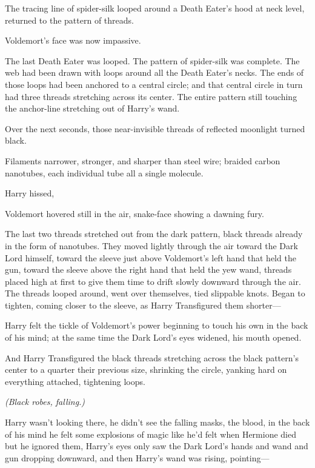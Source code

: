 The tracing line of spider-silk looped around a Death Eater's hood at neck
level, returned to the pattern of threads.

Voldemort's face was now impassive. 

The last Death Eater was looped. The pattern of spider-silk was complete. The
web had been drawn with loops around all the Death Eater's necks. The ends of
those loops had been anchored to a central circle; and that central circle in
turn had three threads stretching across its center. The entire pattern still
touching the anchor-line stretching out of Harry's wand.

Over the next seconds, those near-invisible threads of reflected moonlight
turned black.

Filaments narrower, stronger, and sharper than steel wire; braided carbon
nanotubes, each individual tube all a single molecule.

Harry hissed, 

Voldemort hovered still in the air, snake-face showing a dawning fury.

The last two threads stretched out from the dark pattern, black threads already
in the form of nanotubes. They moved lightly through the air toward the Dark
Lord himself, toward the sleeve just above Voldemort's left hand that held the
gun, toward the sleeve above the right hand that held the yew wand, threads
placed high at first to give them time to drift slowly downward through the
air. The threads looped around, went over themselves, tied slippable knots.
Began to tighten, coming closer to the sleeve, as Harry Transfigured them
shorter---

Harry felt the tickle of Voldemort's power beginning to touch his own in the
back of his mind; at the same time the Dark Lord's eyes widened, his mouth
opened.

And Harry Transfigured the black threads stretching across the black pattern's
center to a quarter their previous size, shrinking the circle, yanking hard on
everything attached, tightening loops.

\emph{(Black robes, falling.)}

Harry wasn't looking there, he didn't see the falling masks, the blood, in the
back of his mind he felt some explosions of magic like he'd felt when Hermione
died but he ignored them, Harry's eyes only saw the Dark Lord's hands and wand
and gun dropping downward, and then Harry's wand was rising, pointing---


